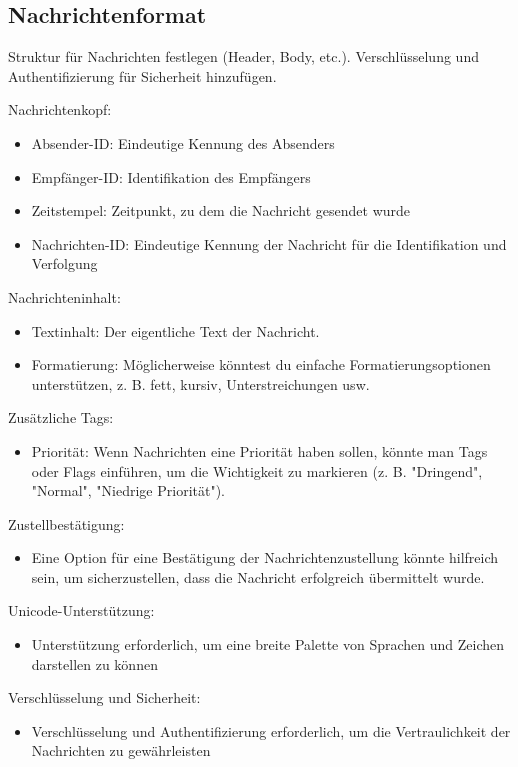 \subsection{Nachrichtenformat}

Struktur für Nachrichten festlegen (Header, Body, etc.).
Verschlüsselung und Authentifizierung für Sicherheit hinzufügen.

Nachrichtenkopf:

\begin{itemize}
    \item Absender-ID: Eindeutige Kennung des Absenders
    \item Empfänger-ID: Identifikation des Empfängers
    \item Zeitstempel: Zeitpunkt, zu dem die Nachricht gesendet wurde
    \item Nachrichten-ID: Eindeutige Kennung der Nachricht für die Identifikation 
    und Verfolgung
\end{itemize}


Nachrichteninhalt:

\begin{itemize}
    \item Textinhalt: Der eigentliche Text der Nachricht.
    \item Formatierung: Möglicherweise könntest du einfache Formatierungsoptionen 
    unterstützen, z. B. fett, kursiv, Unterstreichungen usw.
\end{itemize}


Zusätzliche Tags:
\begin{itemize}
    \item Priorität: Wenn Nachrichten eine Priorität haben sollen, könnte 
    man Tags oder Flags einführen, um die Wichtigkeit zu markieren 
    (z. B. "Dringend", "Normal", "Niedrige Priorität").
\end{itemize}


Zustellbestätigung:
\begin{itemize}
    \item Eine Option für eine Bestätigung der Nachrichtenzustellung könnte 
    hilfreich sein, um sicherzustellen, dass die Nachricht erfolgreich 
    übermittelt wurde.
\end{itemize}


Unicode-Unterstützung:
\begin{itemize}
    \item Unterstützung erforderlich, um eine breite Palette von Sprachen und
    Zeichen darstellen zu können
\end{itemize}

Verschlüsselung und Sicherheit:
\begin{itemize}
    \item Verschlüsselung und Authentifizierung erforderlich, um die 
    Vertraulichkeit der Nachrichten zu gewährleisten
\end{itemize}